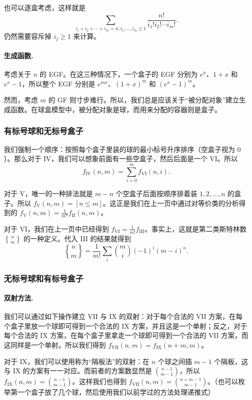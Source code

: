     也可以逐盒考虑，这样就是
    $$
    \sum_{i_1+i_2+\cdots+i_m=n;i_1,\ldots,i_m\ge 1}\frac{n!}{i_1!i_2!\cdots i_m!}.
    $$
    仍然需要容斥掉 $i_j\ge 1$ 来计算。

    \paragraph{生成函数. }    考虑关于 $n$ 的 EGF。在这三种情况下，一个盒子的 EGF 分别为 $e^x$、$1+x$ 和 $e^x-1$，所以整个 EGF 分别是 $e^{mx}$、$(1+x)^m$ 和 $(e^x-1)^m$。

    然而，考虑 $m$ 的 GF 则寸步难行。所以，我们总是应该关于“被分配对象”建立生成函数。在球盒模型中，被分配对象是球，而用来分配的容器则是盒子。

\subsubsection{有标号球和无标号盒子}
    我们强制一个顺序：按照每个盒子里装的球的最小标号升序排序（空盒子视为 $0$）。那么对于 IV，我们可以想象前面有一些空盒子，然后后面是一个 VI。所以
    $$
    f_{\mathrm{IV}}(n,m)=\sum_{i=0}^m f_{\mathrm{VI}}(n,i).
    $$

    对于 V，唯一的一种排法就是 $m-n$ 个空盒子后面按顺序排着装 $1,2,\ldots,n$ 的盒子。所以 $f_{\mathrm{V}}(n,m)=[n\le m]$。这正是我们在上一页中通过对等价类的分析得到的 $f_{\mathrm{V}}(n,m)=\frac{1}{m^{\underline{n}}}f_{\mathrm{II}}(n,m)$。

    对于 VI，我们在上一页中已经得到 $f_{\mathrm{VI}}=\frac{1}{m!}f_{\mathrm{III}}$。事实上，这就是第二类斯特林数 $n\brace m$ 的一种定义。代入 III 的结果就得到
    $$
    {n\brace m}=\frac{1}{m!}\sum_i\binom{m}{i}(-1)^i(m-i)^n.
    $$
\subsubsection{无标号球和有标号盒子}
    \paragraph{双射方法. }
    我们可以通过如下操作建立 VII 与 IX 的双射：对于每个合法的 VII 方案，在每个盒子里放一个球即可得到一个合法的 IX 方案，并且这是一个单射；反之，对于每个合法的 IX 方案，在每个盒子里拿走一个球即可得到一个合法的 VII 方案，而这同样是一个单射。所以我们得到 $f_{\mathrm{VII}}(n,m)=f_{\mathrm{IX}}(n+m,m)$。

    对于 IX，我们可以使用称为“隔板法”的双射：在 $n$ 个球之间插 $m-1$ 个隔板，这与 IX 的方案有一一对应。而前者的方案数显然是 $\binom{n-1}{m-1}$，所以 $f_{\mathrm{IX}}(n,m)=\binom{n-1}{m-1}$。这样我们也得到 $f_{\mathrm{VII}}(n,m)=\binom{n+m-1}{m-1}$。（也可以枚举第一个盒子放了几个球，然后使用我们以前学过的方法处理递推式）

